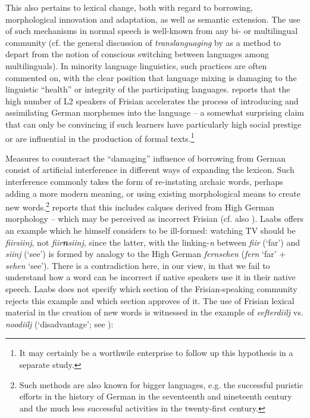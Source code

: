 \documentclass[output=paper]{langsci/langscibook}
\begin{document}
This also pertains to lexical change, both with regard to borrowing, morphological innovation and adaptation, as well as semantic extension. The use of such mechanisms in normal speech is well-known from any bi- or multilingual community (cf. the general discussion of \textit{translanguaging} by \citet{GarciaWei2014} as a method to depart from the notion of conscious switching between languages among multilinguals). In minority language linguistics, such practices are often commented on, with the clear position that language mixing is damaging to the linguistic “health” or integrity of the participating languages. \citet[38]{Laabs2009} reports that the high number of L2 speakers of Frisian accelerates the process of introducing and assimilating German morphemes into the language – a somewhat surprising claim that can only be convincing if such learners have particularly high social prestige or are influential in the production of formal texts.\footnote{It may certainly be a worthwile enterprise to follow up this hypothesis in a separate study.}\par Measures to counteract the “damaging” influence of borrowing from German consist of artificial interference in different ways of expanding the lexicon. Such interference commonly takes the form of re-instating archaic words, perhaps adding a more modern meaning, or using existing morphological means to create new words.\footnote{Such methods are also known for bigger languages, e.g. the successful puristic efforts in the history of German in the seventeenth and nineteenth century and the much less successful activities in the twenty-first century.} \citet[37-38]{Laabs2009} reports that this includes calques derived from High German morphology – which may be perceived as incorrect Frisian (cf. also \citealt[11]{Ebert1994}). Laabs offers an example which he himself considers to be ill-formed: watching TV should be \textit{fiirsiinj}, not \textit{fiir}\textbf{\textit{n}}\textit{siinj}, since the latter, with the linking-\textit{n} between \textit{fiir} (‘far’) and \textit{siinj} (‘see’) is formed by analogy to the High German \textit{fernsehen} (\textit{fern} ‘far’ + \textit{sehen} ‘see’). There is a contradiction here, in our view, in that we fail to understand how a word can be incorrect if native speakers use it in their native speech. Laabs does not specify which section of the Frisian-speaking community rejects this example and which section approves of it. The use of Frisian lexical material in the creation of new words is witnessed in the example of \textit{eefterdiilj} vs. \textit{noodiilj} (‘disadvantage’; see ):
\end{document}

